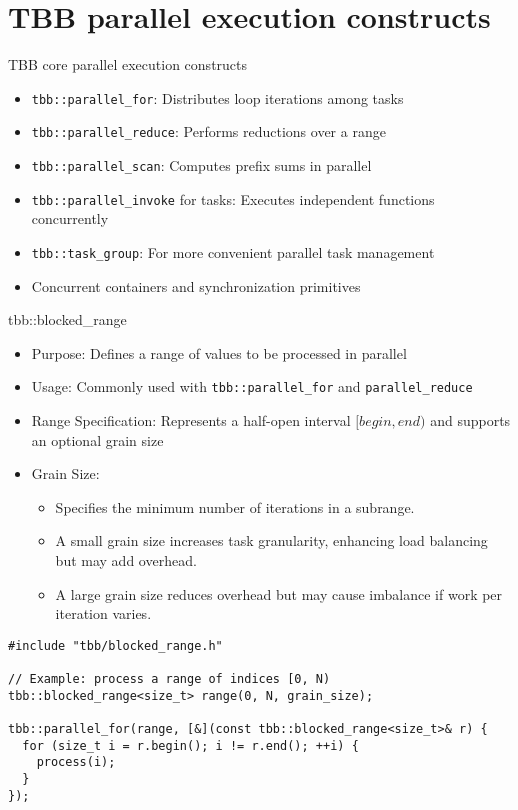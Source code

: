 \documentclass{beamer}
\begin{document}
\section{TBB parallel execution constructs}

\begin{frame}{TBB core parallel execution constructs}
  \begin{itemize}
    \item \texttt{tbb::parallel\_for}: Distributes loop iterations among tasks
    \item \texttt{tbb::parallel\_reduce}: Performs reductions over a range
    \item \texttt{tbb::parallel\_scan}: Computes prefix sums in parallel
    \item \texttt{tbb::parallel\_invoke} for tasks: Executes independent functions concurrently
    \item \texttt{tbb::task\_group}: For more convenient parallel task management
    \item Concurrent containers and synchronization primitives
  \end{itemize}
\end{frame}

\begin{frame}[fragile]{tbb::blocked\_range}
  \begin{itemize}
    \item Purpose: Defines a range of values to be processed in parallel
    \item Usage: Commonly used with \texttt{tbb::parallel\_for} and \texttt{parallel\_reduce}
    \item Range Specification: Represents a half-open interval \([begin, end)\) and supports an optional grain size
    \item Grain Size:
      \begin{itemize}
        \item Specifies the minimum number of iterations in a subrange.
        \item A small grain size increases task granularity, enhancing load balancing but may add overhead.
        \item A large grain size reduces overhead but may cause imbalance if work per iteration varies.
      \end{itemize}
  \end{itemize}

  \vspace{0.5em}

  \lstset{style=CStyle}
  \begin{lstlisting}
#include "tbb/blocked_range.h"

// Example: process a range of indices [0, N)
tbb::blocked_range<size_t> range(0, N, grain_size);

tbb::parallel_for(range, [&](const tbb::blocked_range<size_t>& r) {
  for (size_t i = r.begin(); i != r.end(); ++i) {
    process(i);
  }
});
  \end{lstlisting}
\end{frame}
\end{document}
